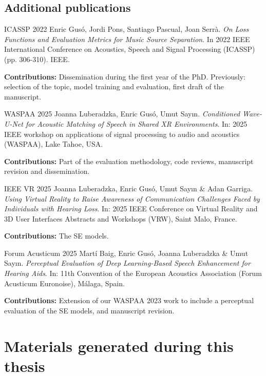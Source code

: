 \section{Additional publications}
\label{sec:pubs_co_author}

\begin{mybox}{ICASSP 2022}
    Enric Gusó, Jordi Pons, Santiago Pascual, Joan Serrà.
    \emph{On Loss Functions and Evaluation Metrics for Music Source Separation}.
    In 2022 IEEE International Conference on Acoustics, Speech and Signal Processing (ICASSP) (pp. 306-310). IEEE. 
\end{mybox}
\textbf{Contributions:} Dissemination during the first year of the PhD. Previously: selection of the topic, model training and evaluation, first draft of the manuscript.

\begin{mybox}{WASPAA 2025}
    Joanna Luberadzka, Enric Gusó, Umut Say\i n.
    \emph{Conditioned Wave-U-Net for Acoustic Matching of Speech in Shared XR Environments}.
    In: 2025 IEEE workshop on applications of signal processing to audio and acoustics (WASPAA), Lake Tahoe, USA. 
\end{mybox}
\textbf{Contributions:} Part of the evaluation methodology, code reviews, manuscript revision and dissemination.

\begin{mybox}{IEEE VR 2025}
    Joanna Luberadzka, Enric Gusó, Umut Say\i n \& Adan Garriga.
    \emph{Using Virtual Reality to Raise Awareness of Communication Challenges Faced by Individuals with Hearing Loss}.
    In: 2025 IEEE Conference on Virtual Reality and 3D User Interfaces Abstracts and Workshops (VRW), Saint Malo, France. 
\end{mybox}
\textbf{Contributions:} The \acrshort{SE} models.

\begin{mybox}{Forum Acusticum 2025}
    Martí Baig, Enric Gusó, Joanna Luberadzka \& Umut Say\i n.
    \emph{Perceptual Evaluation of Deep Learning-Based Speech Enhancement for Hearing Aids}.
    In: 11th Convention of the European Acoustics Association (Forum Acusticum Euronoise), Málaga, Spain.
\end{mybox}
\textbf{Contributions:} Extension of our WASPAA 2023 work to include a perceptual evaluation of the \acrshort{SE} models, and manuscript revision.



\chapter{Materials generated during this thesis}

